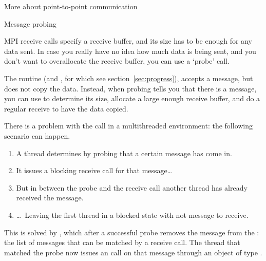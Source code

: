 




 {More about point-to-point communication}

 {Message probing}
\label{sec:mpi-probe}

MPI receive calls specify a receive buffer, and its size has to be
enough for any data sent. In case you really have no idea how much data
is being sent, and you don't want to overallocate the receive buffer,
you can use a `probe' call.

The routine  (and ,
for which see section~\ref{sec:progress}), accepts a message,
but does not copy the data. Instead, when probing tells you that there is a
message, you can use  to determine its size,
allocate a large enough receive buffer, and do a regular receive to
have the data copied.


There is a problem with the  call in a
multithreaded environment: the following scenario can happen.
\begin{enumerate}
\item A thread determines by probing that a certain message has come
  in.
\item It issues a blocking receive call for that message\dots
\item But in between the probe and the receive call another thread
  has already received the message.
\item \dots~Leaving the first thread in a blocked state with not
  message to receive.
\end{enumerate}
This is solved by , which after a successful
probe removes the message from the : the
list of messages that can be matched by a receive call. The thread
that matched the probe now issues an  call on
that message through an object of type .

